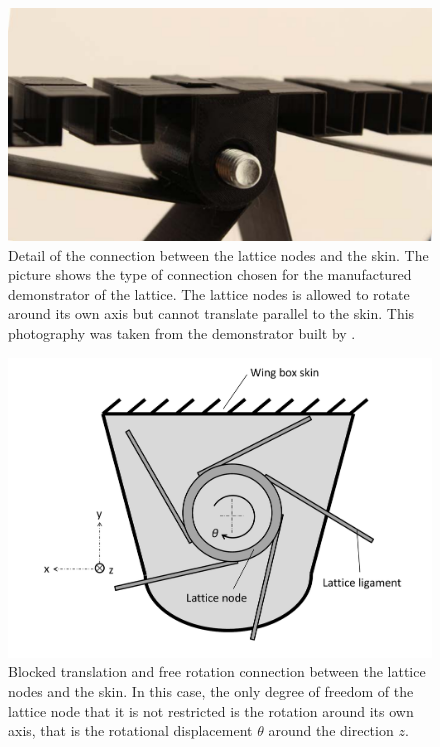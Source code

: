     \begin{figure}[!htpb]
      \centering
      \includegraphics[width=0.8 \textwidth]{figures/model/connectionLatticeNodesToSkin}
      \caption[Detail of the connection between the lattice nodes and the skin]{Detail of the connection between the lattice nodes and the skin. The picture shows the type of connection chosen for the manufactured demonstrator of the lattice. The lattice nodes is allowed to rotate around its own axis but cannot translate parallel to the skin. This photography was taken from the demonstrator built by \cite{Vincenz2017}.}\label{fig:connectionLatticeNodesToSkin}
    \end{figure}

    \begin{figure}[!htpb]
      \centering
      \includegraphics[width=0.6 \textwidth]{figures/model/connectionModeling1}
      \caption[Blocked translation and free rotation connection between the lattice nodes and the skin]{Blocked translation and free rotation connection between the lattice nodes and the skin. In this case, the only degree of freedom of the lattice node that it is not restricted is the rotation around its own axis, that is the rotational displacement $\theta$ around the direction $z$.}\label{fig:connectionModeling1}
    \end{figure}


